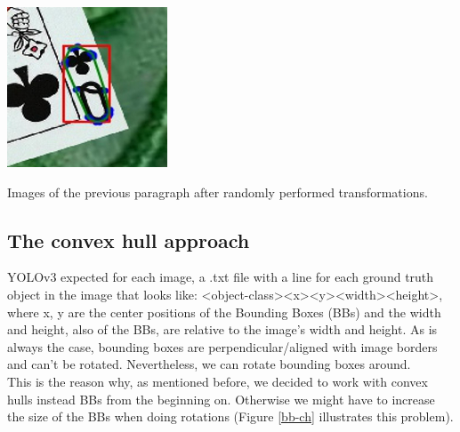 \documentclass[a4paper]{article}
\begin{document}
\begin{minipage}{\columnwidth}
{\includegraphics[scale=0.615]{images/qc_4}}  
\qquad
{}  
\qquad
\caption{Images of the previous paragraph after randomly performed transformations.}
\label{img-cards examples}
\end{minipage}

\subsection*{The convex hull approach}
YOLOv3 expected for each image, a .txt file with a line for each ground truth object in the image that looks like:
<object-class><x><y><width><height>, where x, y are the center positions of the Bounding Boxes (BBs) and the width and height, also of the BBs, are relative to the image's width and height.  
As is always the case, bounding boxes are perpendicular/aligned with image borders and can't be rotated. Nevertheless, we can rotate bounding boxes around. \\
This is the reason why, as mentioned before, we decided to work with convex hulls instead BBs from the beginning on.  Otherwise we might have to increase the size of the BBs when doing rotations (Figure \ref{bb-ch} illustrates this problem). 
\end{document}
